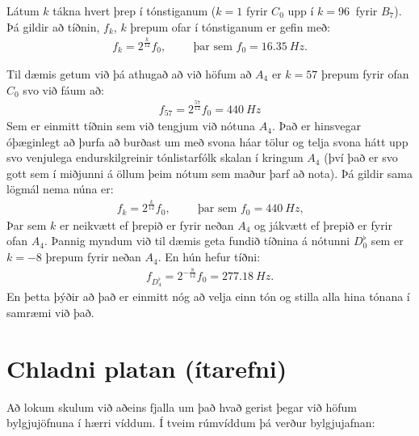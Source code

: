 \ifdefined \wholebook \else\documentclass[oneside]{book}\usepackage{EdlBook}\graphicspath{{figures/}}
\begin{document}
\begin{tcolorbox}
\begin{theorem}
Látum $k$ tákna hvert þrep í tónstiganum ($k = 1$ fyrir $C_0$ upp í $k = \SI{96}{}$ fyrir $B_7$). Þá gildir að tíðnin, $f_k$, $k$ þrepum ofar í tónstiganum er gefin með:
\begin{align*}
    f_k = 2^{\frac{k}{12}} f_0, \hspace{1cm} \text{þar sem $f_0 = \SI{16.35}{Hz}$.}
\end{align*}
\end{theorem}
\end{tcolorbox}

Til dæmis getum við þá athugað að við höfum að $A_4$ er $k = 57$ þrepum fyrir ofan $C_0$ svo við fáum að:
\begin{align*}
    f_{57} = 2^{\frac{57}{12}} f_0 = \SI{440}{Hz}
\end{align*}
Sem er einmitt tíðnin sem við tengjum við nótuna $A_4$. Það er hinsvegar óþæginlegt að þurfa að burðast um með svona háar tölur og telja svona hátt upp svo venjulega endurskilgreinir tónlistarfólk skalan í kringum $A_4$ (því það er svo gott sem í miðjunni á öllum þeim nótum sem maður þarf að nota). Þá gildir sama lögmál nema núna er:
\begin{align*}
    f_k = 2^{\frac{k}{12}}f_0, \hspace{1cm} \text{þar sem $f_0 = \SI{440}{Hz}$,}
\end{align*}
Þar sem $k$ er neikvætt ef þrepið er fyrir neðan $A_4$ og jákvætt ef þrepið er fyrir ofan $A_4$. Þannig myndum við til dæmis geta fundið tíðnina á nótunni $D^\flat_0$ sem er $k = -8$ þrepum fyrir neðan $A_4$. En hún hefur tíðni:
\begin{align*}
    f_{D^\flat_4} = 2^{-\frac{8}{12}} f_0 = \SI{277.18}{Hz}.
\end{align*}
En þetta þýðir að það er einmitt nóg að velja einn tón og stilla alla hina tónana í samræmi við það.


\newpage 

\section{Chladni platan (ítarefni)}

Að lokum skulum við aðeins fjalla um það hvað gerist þegar við höfum bylgjujöfnuna í hærri víddum. Í tveim rúmvíddum þá verður bylgjujafnan:
\end{document}
